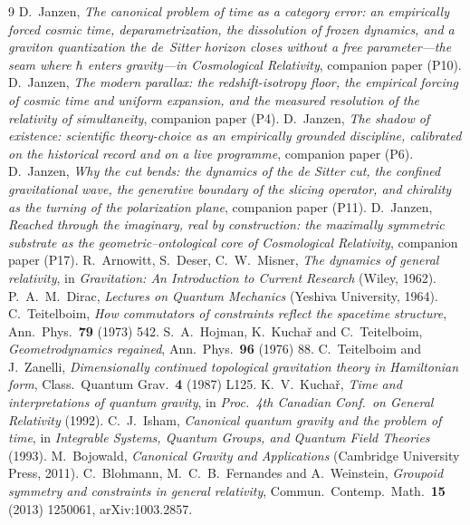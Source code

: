 \documentclass[11pt,a4paper]{article}
\theoremstyle{plain}
\theoremstyle{definition}
\theoremstyle{remark}
\begin{document}
\begin{thebibliography}{9}
 D.~Janzen, \emph{The canonical problem of time as a category error: an empirically forced cosmic time, deparametrization, the dissolution of frozen dynamics, and a graviton quantization the de~Sitter horizon closes without a free parameter---the seam where $\hbar$ enters gravity---in Cosmological Relativity}, companion paper (P10).
 D.~Janzen, \emph{The modern parallax: the redshift-isotropy floor, the empirical forcing of cosmic time and uniform expansion, and the measured resolution of the relativity of simultaneity}, companion paper (P4).
 D.~Janzen, \emph{The shadow of existence: scientific theory-choice as an empirically grounded discipline, calibrated on the historical record and on a live programme}, companion paper (P6).
 D.~Janzen, \emph{Why the cut bends: the dynamics of the de Sitter cut, the confined gravitational wave, the generative boundary of the slicing operator, and chirality as the turning of the polarization plane}, companion paper (P11).
 D.~Janzen, \emph{Reached through the imaginary, real by construction: the maximally symmetric substrate as the geometric--ontological core of Cosmological Relativity}, companion paper (P17).
 R.~Arnowitt, S.~Deser, C.~W.~Misner, \emph{The dynamics of general relativity}, in \emph{Gravitation: An Introduction to Current Research} (Wiley, 1962).
 P.~A.~M.~Dirac, \emph{Lectures on Quantum Mechanics} (Yeshiva University, 1964).
 C.~Teitelboim, \emph{How commutators of constraints reflect the spacetime structure}, Ann.\ Phys.\ \textbf{79} (1973) 542.
 S.~A.~Hojman, K.~Kucha\v{r} and C.~Teitelboim, \emph{Geometrodynamics regained}, Ann.\ Phys.\ \textbf{96} (1976) 88.
 C.~Teitelboim and J.~Zanelli, \emph{Dimensionally continued topological gravitation theory in Hamiltonian form}, Class.\ Quantum Grav.\ \textbf{4} (1987) L125.
 K.~V.~Kucha\v{r}, \emph{Time and interpretations of quantum gravity}, in \emph{Proc.\ 4th Canadian Conf.\ on General Relativity} (1992).
 C.~J.~Isham, \emph{Canonical quantum gravity and the problem of time}, in \emph{Integrable Systems, Quantum Groups, and Quantum Field Theories} (1993).
 M.~Bojowald, \emph{Canonical Gravity and Applications} (Cambridge University Press, 2011).
 C.~Blohmann, M.~C.~B.~Fernandes and A.~Weinstein, \emph{Groupoid symmetry and constraints in general relativity}, Commun.\ Contemp.\ Math.\ \textbf{15} (2013) 1250061, arXiv:1003.2857.

\end{thebibliography}
\end{document}
